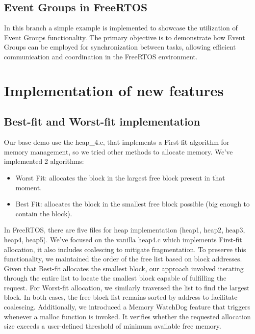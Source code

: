 \subsection{Event Groups in FreeRTOS}%
In this branch a simple example is implemented to showcase the utilization of Event Groups functionality.
The primary objective is to demonstrate how Event Groups can be employed for synchronization between tasks, allowing efficient communication and coordination in the FreeRTOS environment.




\section{Implementation of new features}

\subsection{Best-fit and Worst-fit implementation}
Our base demo use the heap\_4.c, that implements a First-fit algorithm for memory management, so we tried other methods to allocate memory. We've implemented 2 algorithms:
\begin{itemize}
    \item Worst Fit: allocates the block in the largest free block present in that moment.
    \item Best Fit: allocates the block in the smallest free block possible (big enough to contain the block).
\end{itemize}
In FreeRTOS, there are five files for heap implementation (heap1, heap2, heap3, heap4, heap5). We've focused on the vanilla heap4.c which implements First-fit allocation, it also includes coalescing to mitigate fragmentation. To preserve this functionality, we maintained the order of the free list based on block addresses.
Given that Best-fit allocates the smallest block, our approach involved iterating through the entire list to locate the smallest block capable of fulfilling the request. For Worst-fit allocation, we similarly traversed the list to find the largest block. In both cases, the free block list remains sorted by address to facilitate coalescing.
Additionally, we introduced a Memory WatchDog feature that triggers whenever a malloc function is invoked. It verifies whether the requested allocation size exceeds a user-defined threshold of minimum available free memory.

